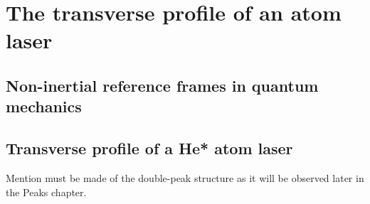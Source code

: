 \chapter{The transverse profile of an atom laser}
\label{TransverseProfile}
\graphicspath{{Figures/TransverseProfile/}{Figures/Common/}}

\section{Non-inertial reference frames in quantum mechanics}
\label{TransverseProfile:DropGP}

\section{Transverse profile of a He* atom laser}
\label{TransverseProfile:Helium}

Mention must be made of the double-peak structure as it will be observed later in the Peaks chapter.

\label{TransverseProfile:He*Experiment}